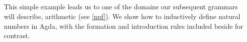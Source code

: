 \begin{code}%
\>[0]\AgdaFunction{\textasciitilde{}}\AgdaSpace{}%
\AgdaSymbol{:}\AgdaSpace{}%
\AgdaSpace{}%
\AgdaSpace{}%
\<%
\\
\>[0]\AgdaFunction{\textasciitilde{}}\AgdaSpace{}%
\AgdaSpace{}%
\AgdaSymbol{=}\AgdaSpace{}%
\AgdaSpace{}%
\AgdaSpace{}%
\AgdaSpace{}%
\AgdaSpace{}%
\AgdaSpace{}%
\<%
\\
%
\\[\AgdaEmptyExtraSkip]%
\>[0]\AgdaSpace{}%
\AgdaSymbol{:}\AgdaSpace{}%
\AgdaSpace{}%
\AgdaSpace{}%
\AgdaSymbol{(}\AgdaSpace{}%
\AgdaSpace{}%
\AgdaSymbol{)}\AgdaSpace{}%
\AgdaSpace{}%
\AgdaSymbol{(}\AgdaSpace{}%
\AgdaSpace{}%
\AgdaSymbol{)}\<%
\\
\>[0]\AgdaSpace{}%
\AgdaSpace{}%
\AgdaSpace{}%
\AgdaSymbol{=}\AgdaSpace{}%
\AgdaSpace{}%
\AgdaSpace{}%
\AgdaSpace{}%
\AgdaSpace{}%
\AgdaSpace{}%
\AgdaSpace{}%
\AgdaSpace{}%
\AgdaSpace{}%
\AgdaSpace{}%
\AgdaSymbol{(}\AgdaFunction{\textasciitilde{}}\AgdaSpace{}%
\AgdaSymbol{)}\<%
\end{code}

This simple example leads us to one of the domains our subsequent grammars will
describe, arithmetic (see \ref{npf}). We show how to inductively define natural numbers in Agda,
with the formation and introduction rules included beside for contrast.


